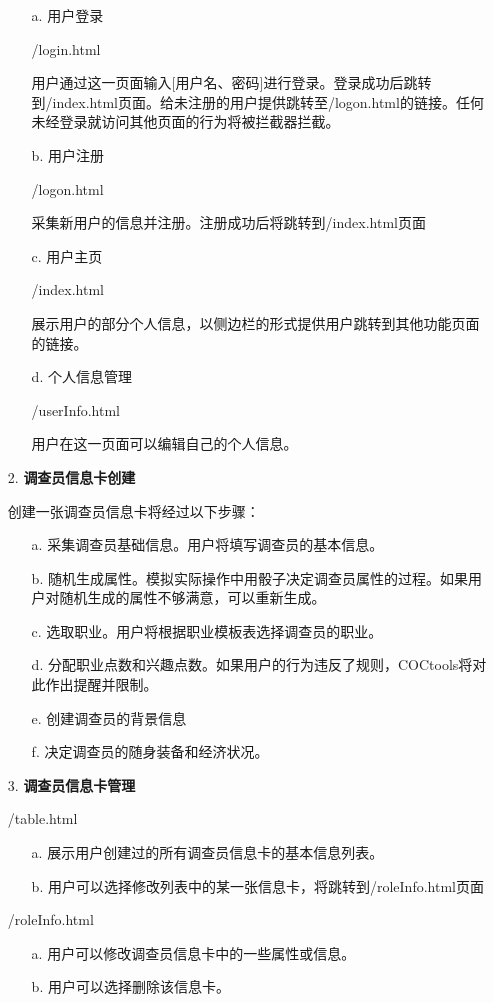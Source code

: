 \documentclass[a4paper,UTF8]{article}
\theoremstyle{definition}
\begin{document}
\begin{CJK}{UTF8}{gkai}
\begin{enumerate}
	\begin{enumerate}
		\item[a.] 用户登录
		\par /login.html
		\par 用户通过这一页面输入[用户名、密码]进行登录。登录成功后跳转到/index.html页面。给未注册的用户提供跳转至/logon.html的链接。任何未经登录就访问其他页面的行为将被拦截器拦截。
		\item[b.] 用户注册
		\par /logon.html
		\par 采集新用户的信息并注册。注册成功后将跳转到/index.html页面
		\item[c.] 用户主页
		\par /index.html
		\par 展示用户的部分个人信息，以侧边栏的形式提供用户跳转到其他功能页面的链接。
		\item[d.] 个人信息管理
		\par /userInfo.html
		\par 用户在这一页面可以编辑自己的个人信息。
	\end{enumerate}
	\item[2.] \textbf{调查员信息卡创建}
	\par 创建一张调查员信息卡将经过以下步骤：
	\begin{enumerate}
		\item[a.] 采集调查员基础信息。用户将填写调查员的基本信息。
		\item[b.] 随机生成属性。模拟实际操作中用骰子决定调查员属性的过程。如果用户对随机生成的属性不够满意，可以重新生成。
		\item[c.] 选取职业。用户将根据职业模板表选择调查员的职业。
		\item[d.] 分配职业点数和兴趣点数。如果用户的行为违反了规则，COCtools将对此作出提醒并限制。
		\item[e.] 创建调查员的背景信息
		\item[f.] 决定调查员的随身装备和经济状况。
	\end{enumerate}
	\item[3.] \textbf{调查员信息卡管理}
	\par /table.html
	\begin{enumerate}
		\item[a.] 展示用户创建过的所有调查员信息卡的基本信息列表。
		\item[b.] 用户可以选择修改列表中的某一张信息卡，将跳转到/roleInfo.html页面
	\end{enumerate}
	\par /roleInfo.html
	\begin{enumerate}
		\item[a.] 用户可以修改调查员信息卡中的一些属性或信息。
		\item[b.] 用户可以选择删除该信息卡。
	\end{enumerate}
\end{enumerate}


\end{CJK}
\end{document}
